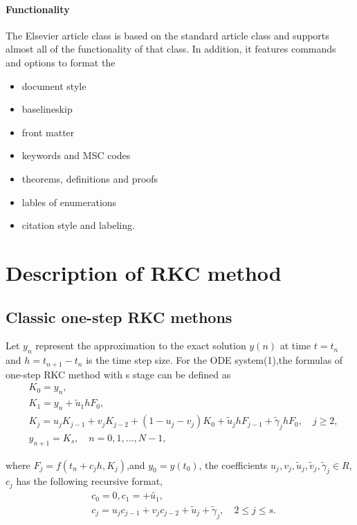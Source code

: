 \documentclass[review,fleqn]{elsarticle}
\begin{document}
\paragraph{Functionality} The Elsevier article class is based on the standard article class and supports almost all of the functionality of that class. In addition, it features commands and options to format the
\begin{itemize}
\item document style
\item baselineskip
\item front matter
\item keywords and MSC codes
\item theorems, definitions and proofs
\item lables of enumerations
\item citation style and labeling.
\end{itemize}

\section{Description of RKC method }
\subsection{Classic one-step RKC methons}
Let $y_n$ represent the approximation to the exact solution $y(n)$ at time $t=t_n$ and $h=t_{n+1}-t_n$ 
is the time step size. For the ODE system(1),the formulas of one-step RKC method with s stage can be defined as 
\begin{equation}
 \begin{aligned}
    &K_{0}=y_{n}, \\
    &K_{1}=y_{n}+\tilde{u}_{1}hF_{0}, \\
    &K_{j}=u_{j}K_{j-1}+v_{j}K_{j-2}+(1-u_{j}-v_{j})K_{0}+\tilde{u}_{j}hF_{j-1}+\tilde{\gamma}_{j}hF_{0},\quad j\geq2, \\
    &y_{n+1}=K_{s},\quad n=0,1,\ldots,N-1, 
 \end{aligned}
 \label{eq:RKC2}
\end{equation}

where \(F_j = f(t_n + c_jh, K_j)\),and $y_0=y(t_0)$, the coefficients \(u_j, v_j, \tilde{u}_j, \tilde{v}_j, \tilde{\gamma}_j \in R \),
 $c_j$ has the following recursive format,
\begin{equation}
 \begin{aligned}
    &c_0=0,c_1=+\tilde{u_1},\\
    &c_j = u_j c_{j-1} + v_j c_{j-2} + \tilde{u}_j + \tilde{\gamma}_j, \quad 2 \leq j \leq s. 
 \end{aligned}
\end{equation}
\end{document}
